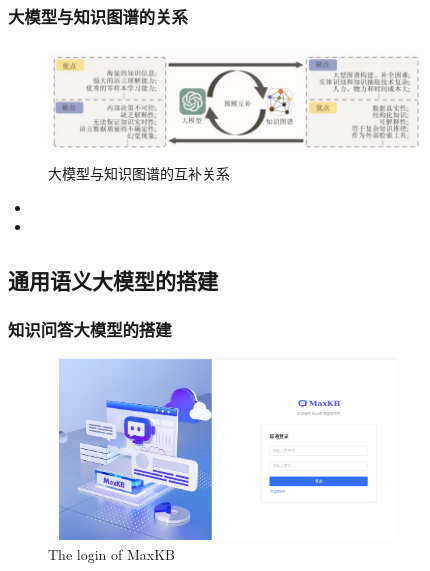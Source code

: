 \begin{frame}
	\frametitle{大模型与知识图谱的关系}
\begin{figure}[h!]
\centering
\vskip -8pt
\includegraphics[height=1.2in,width=3.90in,viewport=3 0 185 60,clip]{Figures/KG_Chem-LLM.png}
\caption{\tiny\textrm{大模型与知识图谱的互补关系}}%
\label{Fig:KG_Chem-LLM}
\end{figure}
\begin{itemize}
	\item {\fontsize{7.2pt}{6.2pt}\selectfont{知识图谱对大模型的增强:~为大模型提供真实可靠的知识，减轻大模型产生幻觉的问题，提供解释和推理知识的手段，探究大模型内部复杂的工作步骤和推理过程}}%
	\item {\fontsize{7.2pt}{6.2pt}\selectfont{大模型对知识图谱的增强：大模型在零样本和少样本的训练中，能够应对知识图谱构建、补全、推理和问答等各种挑战}}%
\end{itemize}
\end{frame}

\subsection{通用语义大模型的搭建}
\begin{frame}
	\frametitle{知识问答大模型的搭建}
\begin{figure}[h!]
\centering
\vskip -8pt
\includegraphics[height=1.90in,width=3.75in,viewport=0 0 1409 750,clip]{Figures/MaxKB_login.png}
\caption{\tiny\textrm{The login of MaxKB}}%
\label{Fig:MaxKB_login}
\end{figure}
{\fontsize{7.5pt}{6.0pt}}
\end{frame}

